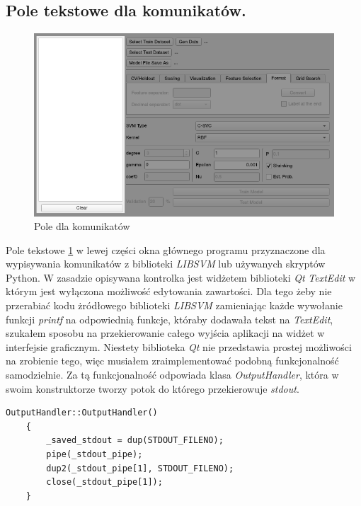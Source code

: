 \documentclass[paper=a4, fontsize=11pt]{scrartcl} %
\numberwithin{equation}{section} %
\numberwithin{figure}{section} %
\begin{document}
\newpage %
\subsection{Pole tekstowe dla komunikatów.}

    \begin{figure}[H]
        \begin{center}
            \includegraphics[scale=0.7]{./img/svm_app_mainw_textedit.png}
            \caption{Pole dla komunikatów}
            \label{fig:text_edit}
        \end{center}
    \end{figure}

    \par Pole tekstowe \ref{fig:text_edit} w lewej części okna głównego programu przyznaczone
    dla wypisywania komunikatów z biblioteki \textit{LIBSVM} lub używanych skryptów Python. W
    zasadzie opisywana kontrolka jest widżetem biblioteki \textit{Qt} \textit{TextEdit} w
    którym jest wyłączona możliwość edytowania zawartości. Dla tego żeby nie przerabiać kodu
    żródłowego biblioteki \textit{LIBSVM} zamieniając każde wywołanie funkcji \textit{printf}
    na odpowiednią funkcje, któraby dodawała tekst na \textit{TextEdit}, szukałem sposobu na
    przekierowanie całego wyjścia aplikacji na widżet w interfejsie graficznym. Niestety
    biblioteka \textit{Qt} nie przedstawia prostej możliwości na zrobienie tego, więc musiałem
    zraimplementować podobną funkcjonalność samodzielnie. Za tą funkcjonalność odpowiada klasa
    \textit{OutputHandler}, która w swoim konstruktorze tworzy potok do którego przekierowuje
    \textit{stdout}.

    \begin{lstlisting}[caption={Konstruktor klasy \textit{OutputHandler}},captionpos=b]
    OutputHandler::OutputHandler()
    {
        _saved_stdout = dup(STDOUT_FILENO);
        pipe(_stdout_pipe);
        dup2(_stdout_pipe[1], STDOUT_FILENO);
        close(_stdout_pipe[1]);
    }
    \end{lstlisting}
\end{document}
